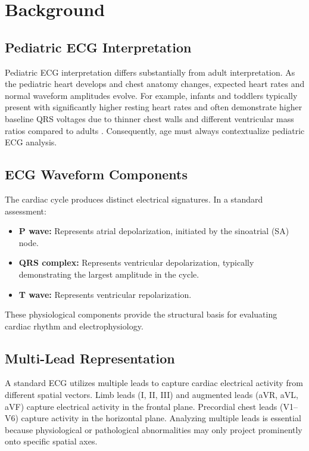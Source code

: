 \documentclass[11pt, a4paper]{article}
\begin{document}
\section{Background}

\subsection{Pediatric ECG Interpretation}
Pediatric ECG interpretation differs substantially from adult interpretation. As the pediatric heart develops and chest anatomy changes, expected heart rates and normal waveform amplitudes evolve. For example, infants and toddlers typically present with significantly higher resting heart rates and often demonstrate higher baseline QRS voltages due to thinner chest walls and different ventricular mass ratios compared to adults \cite{Tan2025}. Consequently, age must always contextualize pediatric ECG analysis.

\subsection{ECG Waveform Components}
The cardiac cycle produces distinct electrical signatures. In a standard assessment:
\begin{itemize}
    \item \textbf{P wave:} Represents atrial depolarization, initiated by the sinoatrial (SA) node.
    \item \textbf{QRS complex:} Represents ventricular depolarization, typically demonstrating the largest amplitude in the cycle.
    \item \textbf{T wave:} Represents ventricular repolarization.
\end{itemize}
These physiological components provide the structural basis for evaluating cardiac rhythm and electrophysiology.

\subsection{Multi-Lead Representation}
A standard ECG utilizes multiple leads to capture cardiac electrical activity from different spatial vectors. Limb leads (I, II, III) and augmented leads (aVR, aVL, aVF) capture electrical activity in the frontal plane. Precordial chest leads (V1--V6) capture activity in the horizontal plane. Analyzing multiple leads is essential because physiological or pathological abnormalities may only project prominently onto specific spatial axes.
\end{document}

